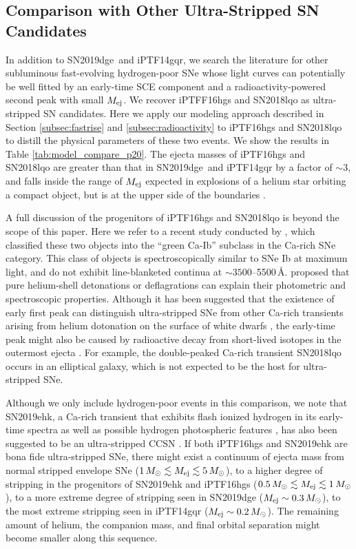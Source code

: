 \documentclass[twocolumn]{aastex63}
\newcommand{\name}{SN2019dge}
\begin{document}
\subsection{Comparison with Other Ultra-Stripped SN Candidates}

In addition to \name\ and iPTF14gqr, we search the literature for other subluminous fast-evolving 
hydrogen-poor SNe whose light curves can potentially be well fitted by an early-time {	
\color{red}SCE component} and a radioactivity-powered second peak with small $M_{\rm ej}$. We 
recover iPTFF16hgs 
\citep{DeKC2018} and SN2018lqo \citep{De2020b} as ultra-stripped SN candidates. Here we apply our 
modeling approach described in Section \ref{subsec:fastrise} and 
\ref{subsec:radioactivity} to iPTF16hgs and SN2018lqo to distill the physical parameters of these two 
events. We show the results in Table \ref{tab:model_compare_p20}. The ejecta masses of 
iPTF16hgs and SN2018lqo are greater than that in \name\ and iPTF14gqr by a factor of $\sim3$, 
and falls inside the range of $M_{\rm ej}$ expected in explosions of a helium star orbiting a compact 
object, but is at the upper side of the boundaries \citep{Tauris2015}. 

A full discussion of the progenitors of iPTF16hgs and SN2018lqo is beyond the scope of this paper. 
Here we refer to a recent study conducted by \citet{De2020b}, which {\color{red}classified} these two 
objects into 
the ``green Ca-Ib'' subclass in the Ca-rich SNe category. This class of objects is spectroscopically 
similar to SNe Ib at maximum light, and do not exhibit line-blanketed continua at 
$\sim3500$--5500\,\AA.  \citet{De2020b} proposed that pure helium-shell detonations or deflagrations 
can explain their photometric and spectroscopic properties. Although it has been suggested that the 
existence of early first peak can distinguish ultra-stripped SNe from other Ca-rich transients arising 
from helium dotonation on the surface of white dwarfs \citep{Nakaoka2020}, the early-time peak might 
also be caused by radioactive decay from short-lived isotopes in the outermost ejecta \citep{De2020b}. 
For example, the double-peaked Ca-rich transient SN2018lqo occurs in an elliptical galaxy, which is not 
expected to be the host for ultra-stripped SNe.

Although we only include hydrogen-poor events in this comparison, we note that SN2019ehk, a 
Ca-rich transient that exhibits flash ionized hydrogen in its early-time spectra 
\citep{Jacobson-Galan2020} as well as possible hydrogen photospheric features \citep{De2020b}, has 
also been suggested to be an ultra-stripped CCSN \citep{Nakaoka2020}. If both iPTF16hgs and 
SN2019ehk are bona fide ultra-stripped SNe, there might exist a continuum of ejecta mass from 
normal stripped envelope SNe ($1\,M_\odot \lesssim M_{\rm ej} \lesssim 5\,M_\odot$), to a higher 
degree of stripping in the progenitors of SN2019ehk and iPTF16hgs ($0.5\,M_\odot \lesssim M_{\rm 
ej}\lesssim 1\,M_\odot$), to a more extreme degree of stripping seen in SN2019dge ($M_{\rm ej}\sim 
0.3\,M_\odot$), to the most extreme stripping seen in iPTF14gqr ($M_{\rm ej}\sim 0.2\,M_\odot$). The 
remaining amount of helium, the companion mass, and final orbital separation might become smaller 
along this sequence.
\end{document}
